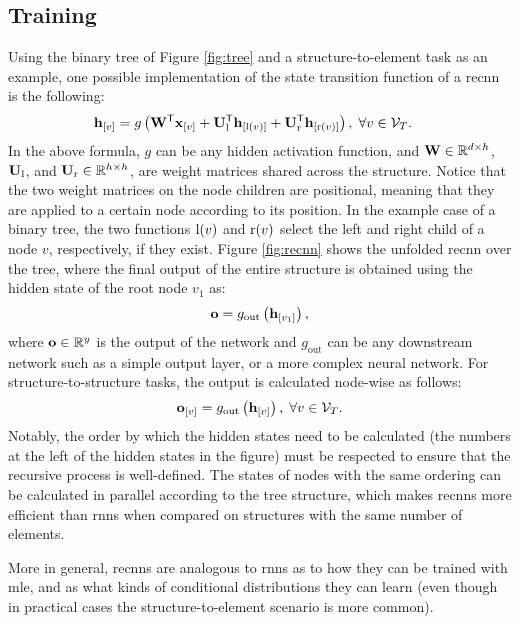 \subsection{Training}
Using the binary tree of Figure \ref{fig:tree} and a structure-to-element task as an example, one possible implementation of the state transition function of a \gls{recnn} is the following:
\begin{align*}
    \Elem{h}{v} &= g\Paren{\Matrix{W}^{\Transpose}\Elem{x}{v} + \Matrix{U}_\Fun{l}^{\Transpose}\Elem{h}{\Fun{l}(v)} + \Matrix{U}_\Fun{r}^{\Transpose}\Elem{h}{\Fun{r}(v)}},\; \forall v \in \Cal{v}_{T}.
\end{align*} 
In the above formula, $g$ can be any hidden activation function, and $\Matrix{w} \in \Real^{d \times h}$, $\Matrix{u}_\Fun{l}$, and $\Matrix{u}_\Fun{r} \in \Real^{h \times h}$, are weight matrices shared across the structure. Notice that the two weight matrices on the node children are positional, meaning that they are applied to a certain node according to its position. In the example case of a binary tree, the two functions $\mathrm{l}(v)$ and $\mathrm{r}(v)$ select the left and right child of a node $v$, respectively, if they exist. Figure \ref{fig:recnn} shows the unfolded \gls{recnn} over the tree, where the final output of the entire structure is obtained using the hidden state of the root node $v_1$ as:
$$\Vector{o} = g_{\mathrm{out}}\Paren{\Elem{h}{v_1}},$$
where $\Vector{o} \in \Real^y$ is the output of the network and $g_{\mathrm{out}}$ can be any downstream network such as a simple output layer, or a more complex neural network. For structure-to-structure tasks, the output is calculated node-wise as follows:
$$\Elem{o}{v} = g_{\mathrm{out}}\Paren{\Elem{h}{v}},\; \forall v \in \Cal{v}_{T}.$$
Notably, the order by which the hidden states need to be calculated (the numbers at the left of the hidden states in the figure) must be respected to ensure that the recursive process is well-defined. The states of nodes with the same ordering can be calculated in parallel according to the tree structure, which makes \glspl{recnn} more efficient than \glspl{rnn} when compared on structures with the same number of elements.
\begin{figure*}[h!]
    \centering
    \resizebox{.5\textwidth}{!}{}
    \caption{A recursive neural network unfolded over the tree of Figure \ref{fig:tree} for a structure-to-element task. The number at the left of the hidden states indicates the order in which they are calculated. The black boxes represent  state vectors used to initialize the process at the leaves.}
    \label{fig:recnn}
\end{figure*}
More in general, \glspl{recnn} are analogous to \glspl{rnn} as to how they can be trained with \gls{mle}, and as what kinds of conditional distributions they can learn (even though in practical cases the structure-to-element scenario is more common).


